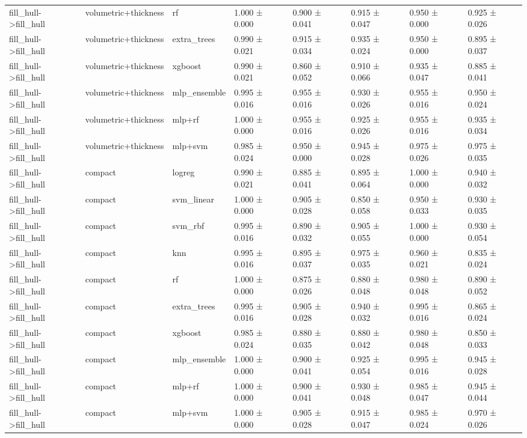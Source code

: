 \begin{tabular}{llllllll}
fill\_hull->fill\_hull & volumetric+thickness & rf & 1.000 ± 0.000 & 0.900 ± 0.041 & 0.915 ± 0.047 & 0.950 ± 0.000 & 0.925 ± 0.026 \\
fill\_hull->fill\_hull & volumetric+thickness & extra\_trees & 0.990 ± 0.021 & 0.915 ± 0.034 & 0.935 ± 0.024 & 0.950 ± 0.000 & 0.895 ± 0.037 \\
fill\_hull->fill\_hull & volumetric+thickness & xgboost & 0.990 ± 0.021 & 0.860 ± 0.052 & 0.910 ± 0.066 & 0.935 ± 0.047 & 0.885 ± 0.041 \\
fill\_hull->fill\_hull & volumetric+thickness & mlp\_ensemble & 0.995 ± 0.016 & 0.955 ± 0.016 & 0.930 ± 0.026 & 0.955 ± 0.016 & 0.950 ± 0.024 \\
fill\_hull->fill\_hull & volumetric+thickness & mlp+rf & 1.000 ± 0.000 & 0.955 ± 0.016 & 0.925 ± 0.026 & 0.955 ± 0.016 & 0.935 ± 0.034 \\
fill\_hull->fill\_hull & volumetric+thickness & mlp+svm & 0.985 ± 0.024 & 0.950 ± 0.000 & 0.945 ± 0.028 & 0.975 ± 0.026 & 0.975 ± 0.035 \\
fill\_hull->fill\_hull & compact & logreg & 0.990 ± 0.021 & 0.885 ± 0.041 & 0.895 ± 0.064 & 1.000 ± 0.000 & 0.940 ± 0.032 \\
fill\_hull->fill\_hull & compact & svm\_linear & 1.000 ± 0.000 & 0.905 ± 0.028 & 0.850 ± 0.058 & 0.950 ± 0.033 & 0.930 ± 0.035 \\
fill\_hull->fill\_hull & compact & svm\_rbf & 0.995 ± 0.016 & 0.890 ± 0.032 & 0.905 ± 0.055 & 1.000 ± 0.000 & 0.930 ± 0.054 \\
fill\_hull->fill\_hull & compact & knn & 0.995 ± 0.016 & 0.895 ± 0.037 & 0.975 ± 0.035 & 0.960 ± 0.021 & 0.835 ± 0.024 \\
fill\_hull->fill\_hull & compact & rf & 1.000 ± 0.000 & 0.875 ± 0.026 & 0.880 ± 0.048 & 0.980 ± 0.048 & 0.890 ± 0.052 \\
fill\_hull->fill\_hull & compact & extra\_trees & 0.995 ± 0.016 & 0.905 ± 0.028 & 0.940 ± 0.032 & 0.995 ± 0.016 & 0.865 ± 0.024 \\
fill\_hull->fill\_hull & compact & xgboost & 0.985 ± 0.024 & 0.880 ± 0.035 & 0.880 ± 0.042 & 0.980 ± 0.048 & 0.850 ± 0.033 \\
fill\_hull->fill\_hull & compact & mlp\_ensemble & 1.000 ± 0.000 & 0.900 ± 0.041 & 0.925 ± 0.054 & 0.995 ± 0.016 & 0.945 ± 0.028 \\
fill\_hull->fill\_hull & compact & mlp+rf & 1.000 ± 0.000 & 0.900 ± 0.041 & 0.930 ± 0.048 & 0.985 ± 0.047 & 0.945 ± 0.044 \\
fill\_hull->fill\_hull & compact & mlp+svm & 1.000 ± 0.000 & 0.905 ± 0.028 & 0.915 ± 0.047 & 0.985 ± 0.024 & 0.970 ± 0.026 \\
\bottomrule
\end{tabular}
